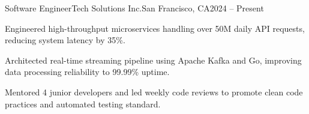 \begin{cventry}{Software Engineer}{Tech Solutions Inc.}{San Francisco, CA}{2024 -- Present}
    \item Engineered high-throughput microservices handling over 50M daily API requests, reducing system latency by 35\%.
    \item Architected real-time streaming pipeline using Apache Kafka and Go, improving data processing reliability to 99.99\% uptime.
    \item Mentored 4 junior developers and led weekly code reviews to promote clean code practices and automated testing standard.
\end{cventry}
